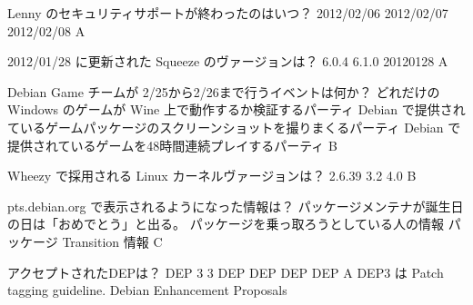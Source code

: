%

\santaku
{Lenny のセキュリティサポートが終わったのはいつ？}
{2012/02/06}
{2012/02/07}
{2012/02/08}
{A}
{}

\santaku
{2012/01/28 に更新された Squeeze のヴァージョンは？}
{6.0.4}
{6.1.0}
{20120128}
{A}
{}

\santaku
{Debian Game チームが 2/25から2/26まで行うイベントは何か？}
{どれだけの Windows のゲームが Wine 上で動作するか検証するパーティ}
{Debian で提供されているゲームパッケージのスクリーンショットを撮りまくるパーティ}
{Debian で提供されているゲームを48時間連続プレイするパーティ}
{B}
{}

\santaku
{Wheezy で採用される Linux カーネルヴァージョンは？}
{2.6.39}
{3.2}
{4.0}
{B}
{}

\santaku
{pts.debian.org で表示されるようになった情報は？}
{パッケージメンテナが誕生日の日は「おめでとう」と出る。}
{パッケージを乗っ取ろうとしている人の情報}
{パッケージ Transition 情報}
{C}
{}

\santaku
{アクセプトされたDEPは？}
{DEP 3}
{3 DEP }
{DEP DEP DEP}
{A}
{DEP3 は Patch tagging guideline. Debian Enhancement Proposals}


